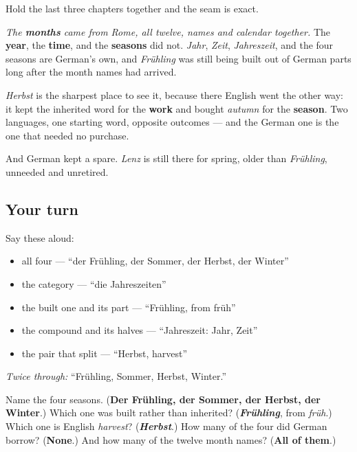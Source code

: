 \begin{culture}
Hold the last three chapters together and the seam is exact.

\emph{ The \textbf{months} came from Rome, all twelve, names and calendar together. } The \textbf{year}, the \textbf{time}, and the \textbf{seasons} did not. \emph{Jahr}, \emph{Zeit}, \emph{Jahreszeit}, and the four seasons are German's own, and \emph{Frühling} was still being built out of German parts long after the month names had arrived.

\emph{Herbst} is the sharpest place to see it, because there English went the other way: it kept the inherited word for the \textbf{work} and bought \emph{autumn} for the \textbf{season}. Two languages, one starting word, opposite outcomes — and the German one is the one that needed no purchase.

And German kept a spare. \emph{Lenz} is still there for spring, older than \emph{Frühling}, unneeded and unretired.
\end{culture}

\subsection*{Your turn}
Say these aloud:

\begin{itemize}
\raggedright
  \item all four — \textquotedblleft{}der Frühling, der Sommer, der Herbst, der Winter\textquotedblright{}
  \item the category — \textquotedblleft{}die Jahreszeiten\textquotedblright{}
  \item the built one and its part — \textquotedblleft{}Frühling, from früh\textquotedblright{}
  \item the compound and its halves — \textquotedblleft{}Jahreszeit: Jahr, Zeit\textquotedblright{}
  \item the pair that split — \textquotedblleft{}Herbst, harvest\textquotedblright{}
\end{itemize}

\emph{Twice through:} \textquotedblleft{}Frühling, Sommer, Herbst, Winter.\textquotedblright{}

\begin{tcolorbox}[breakable,colback=teal!4,colframe=teal!35!black,title={Before you move on}]
Name the four seasons. (\textbf{Der Frühling, der Sommer, der Herbst, der Winter}.) Which one was built rather than inherited? (\emph{\textbf{Frühling}}, from \emph{früh}.) Which one is English \emph{harvest}? (\emph{\textbf{Herbst}}.) How many of the four did German borrow? (\textbf{None}.) And how many of the twelve month names? (\textbf{All of them}.)
\end{tcolorbox}
